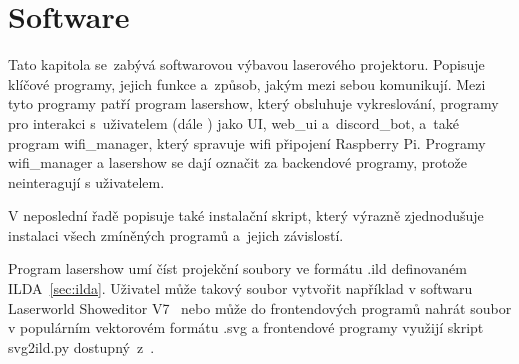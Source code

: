\chapter{Software}

Tato kapitola se~zabývá softwarovou výbavou laserového projektoru. Popisuje klíčové programy, jejich funkce a~způsob, jakým mezi sebou komunikují.
Mezi tyto programy patří program lasershow, který obsluhuje vykreslování, programy pro interakci s~uživatelem (dále ) jako UI, web\_ui a~discord\_bot, a~také program wifi\_manager, který spravuje wifi připojení Raspberry Pi.
Programy wifi\_manager a lasershow se dají označit za backendové programy, protože neinteragují s uživatelem.

V neposlední řadě popisuje také instalační skript, který výrazně zjednodušuje instalaci všech zmíněných programů a~jejich závislostí.

Program lasershow umí číst projekční soubory ve formátu .ild definovaném ILDA~\ref{sec:ilda}.
Uživatel může takový soubor vytvořit například v softwaru Laserworld Showeditor V7~\cite{showeditor} nebo může do frontendových programů nahrát soubor v populárním vektorovém formátu .svg a frontendové programy využijí skript svg2ild.py dostupný~z~\cite{svg2ild}.




